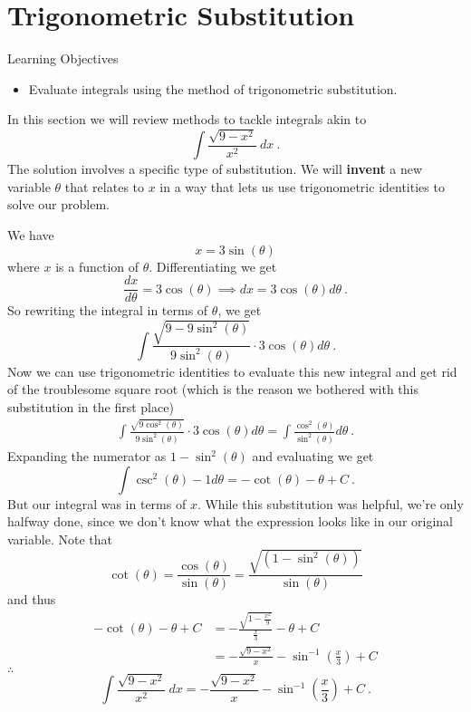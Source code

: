 \documentclass[compacto,10pt,comentarios]{aleph-notas}
\begin{document}
\encabezado

\section*{Trigonometric Substitution}
\begin{mdframed}
    \center Learning Objectives \\
    \begin{itemize}
        \item Evaluate integrals using the method of trigonometric substitution.
    \end{itemize}
\end{mdframed}

In this section we will review methods to tackle integrals akin to
$$
    \int \frac{\sqrt{9 - x^{2}}}{x^{2}} ~ dx ~ .
$$
The solution involves a specific type of substitution.
We will \textbf{invent} a new variable $\theta$ that relates to $x$ in a way that lets us use trigonometric identities to solve our problem.

We have
$$
    x = 3\sin(\theta)
$$
where $x$ is a function of $\theta$. Differentiating we get
$$
    \frac{dx}{d\theta}=3\cos(\theta) \implies dx=3\cos(\theta) d\theta ~ .
$$
So rewriting the integral in terms of $\theta$, we get
$$
    \int \frac {\sqrt{9-9\sin^2(\theta)}}{9\sin^2(\theta)}\cdot3\cos(\theta)d\theta ~ .
$$
Now we can use trigonometric identities to evaluate this new integral and get rid of the troublesome square root (which is the reason we bothered with this substitution in the first place)
\begin{align*}
    \int \frac {\sqrt{9\cos^2(\theta)}}{9\sin^2(\theta)}\cdot3\cos(\theta)d\theta = \int \frac {\cos^2(\theta)}{\sin^2(\theta)}d\theta ~ .
\end{align*}
Expanding the numerator as $1 - \sin^{2}(\theta)$ and evaluating we get
$$
    \int \csc^2(\theta)-1 d\theta = -\cot(\theta)-\theta + C ~ .
$$
But our integral was in terms of $x$. While this substitution was helpful, we're only halfway done, since we don't know what the expression looks like in our original variable.
Note that
$$
    \cot(\theta)=\frac{\cos(\theta)}{\sin(\theta)}=\frac{\sqrt{(1-\sin^2(\theta))}}{\sin(\theta)}
$$
and thus
\begin{align*}
    -\cot(\theta)-\theta + C
    & = -\frac{\sqrt{1-\frac {x^2} 9}}{\frac x 3} - \theta + C \\
    & = -\frac{\sqrt{9-x^2}}{x}-\sin^{-1}\left(\frac{x}{3}\right) + C
\end{align*}
$\therefore$
$$
    \int \frac{\sqrt{9 - x^{2}}}{x^{2}} ~ dx = -\frac{\sqrt{9-x^2}}{x}-\sin^{-1}\left(\frac{x}{3}\right) + C ~ .
$$
\end{document}
